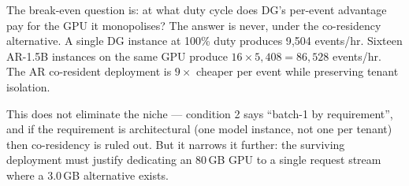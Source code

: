 The break-even question is: at what duty cycle does DG's per-event
advantage pay for the GPU it monopolises? The answer is never, under the
co-residency alternative. A single DG instance at 100\% duty produces
9{,}504 events/hr. Sixteen AR-1.5B instances on the same GPU produce
$16 \times 5{,}408 = 86{,}528$ events/hr. The AR co-resident deployment
is $9\times$ cheaper per event while preserving tenant isolation.

This does not eliminate the niche --- condition 2 says ``batch-1 by
requirement'', and if the requirement is architectural (one model
instance, not one per tenant) then co-residency is ruled out. But it
narrows it further: the surviving deployment must justify dedicating an
80\,GB GPU to a single request stream where a 3.0\,GB alternative exists.
